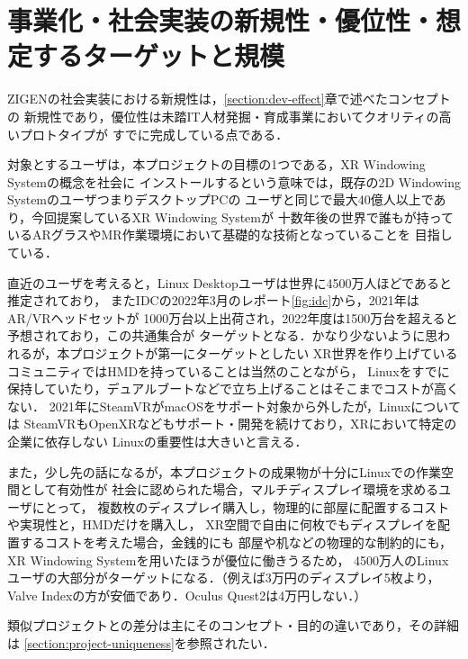 \section{事業化・社会実装の新規性・優位性・想定するターゲットと規模}


ZIGENの社会実装における新規性は，\ref{section:dev-effect}章で述べたコンセプトの
新規性であり，優位性は未踏IT人材発掘・育成事業においてクオリティの高いプロトタイプが
すでに完成している点である．

対象とするユーザは，本プロジェクトの目標の1つである，XR Windowing Systemの概念を社会に
インストールするという意味では，既存の2D Windowing SystemのユーザつまりデスクトップPCの
ユーザと同じで最大40億人以上であり，今回提案しているXR Windowing Systemが
十数年後の世界で誰もが持っているARグラスやMR作業環境において基礎的な技術となっていることを
目指している．

直近のユーザを考えると，Linux Desktopユーザは世界に4500万人ほどであると推定されており，
またIDCの2022年3月のレポート\ref{fig:idc}から，2021年はAR/VRヘッドセットが
1000万台以上出荷され，2022年度は1500万台を超えると予想されており，この共通集合が
ターゲットとなる．かなり少ないように思われるが，本プロジェクトが第一にターゲットとしたい
XR世界を作り上げているコミュニティではHMDを持っていることは当然のことながら，
Linuxをすでに保持していたり，デュアルブートなどで立ち上げることはそこまでコストが高くない．
2021年にSteamVRがmacOSをサポート対象から外したが，Linuxについては
SteamVRもOpenXRなどもサポート・開発を続けており，XRにおいて特定の企業に依存しない
Linuxの重要性は大きいと言える．

また，少し先の話になるが，本プロジェクトの成果物が十分にLinuxでの作業空間として有効性が
社会に認められた場合，マルチディスプレイ環境を求めるユーザにとって，
複数枚のディスプレイ購入し，物理的に部屋に配置するコストや実現性と，HMDだけを購入し，
XR空間で自由に何枚でもディスプレイを配置するコストを考えた場合，金銭的にも
部屋や机などの物理的な制約的にも，XR Windowing Systemを用いたほうが優位に働きうるため，
4500万人のLinuxユーザの大部分がターゲットになる．（例えば3万円のディスプレイ5枚より，
Valve Indexの方が安価であり．Oculus Quest2は4万円しない．）

類似プロジェクトとの差分は主にそのコンセプト・目的の違いであり，その詳細は
\ref{section:project-uniqueness}を参照されたい．
